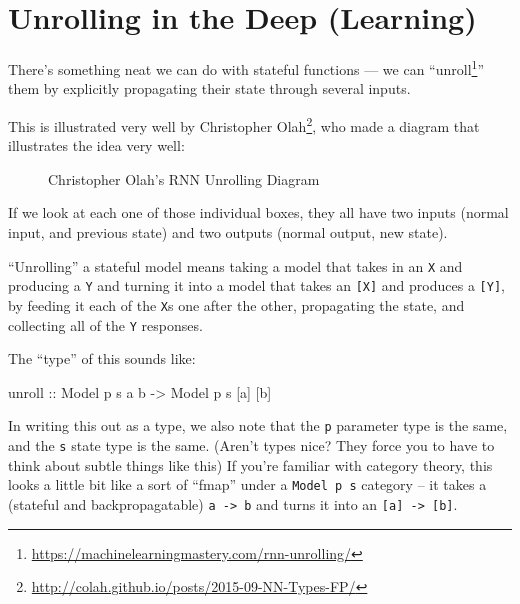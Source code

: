 \documentclass[]{article}
\newenvironment{Shaded}{}{}
\newcommand{\DataTypeTok}[1]{\textcolor[rgb]{0.56,0.13,0.00}{#1}}
\newcommand{\NormalTok}[1]{#1}
\newcommand{\OtherTok}[1]{\textcolor[rgb]{0.00,0.44,0.13}{#1}}
\renewcommand{\href}[2]{#2\footnote{\url{#1}}}
\begin{document}
\section{Unrolling in the Deep (Learning)}\label{unrolling-in-the-deep-learning}

There's something neat we can do with stateful functions --- we can
``\href{https://machinelearningmastery.com/rnn-unrolling/}{unroll}'' them by
explicitly propagating their state through several inputs.

This is illustrated very well by
\href{http://colah.github.io/posts/2015-09-NN-Types-FP/}{Christopher Olah}, who
made a diagram that illustrates the idea very well:

\begin{figure}
\centering
{}
\caption{Christopher Olah's RNN Unrolling Diagram}
\end{figure}

If we look at each one of those individual boxes, they all have two inputs
(normal input, and previous state) and two outputs (normal output, new state).

``Unrolling'' a stateful model means taking a model that takes in an \texttt{X}
and producing a \texttt{Y} and turning it into a model that takes an
\texttt{{[}X{]}} and produces a \texttt{{[}Y{]}}, by feeding it each of the
\texttt{X}s one after the other, propagating the state, and collecting all of
the \texttt{Y} responses.

The ``type'' of this sounds like:

\begin{Shaded}
\begin{Highlighting}[]
\OtherTok{unroll ::} \DataTypeTok{Model}\NormalTok{ p s a b }\OtherTok{{-}\textgreater{}} \DataTypeTok{Model}\NormalTok{ p s [a] [b]}
\end{Highlighting}
\end{Shaded}

In writing this out as a type, we also note that the \texttt{p} parameter type
is the same, and the \texttt{s} state type is the same. (Aren't types nice? They
force you to have to think about subtle things like this) If you're familiar
with category theory, this looks a little bit like a sort of ``fmap'' under a
\texttt{Model\ p\ s} category -- it takes a (stateful and backpropagatable)
\texttt{a\ -\textgreater{}\ b} and turns it into an
\texttt{{[}a{]}\ -\textgreater{}\ {[}b{]}}.
\end{document}
